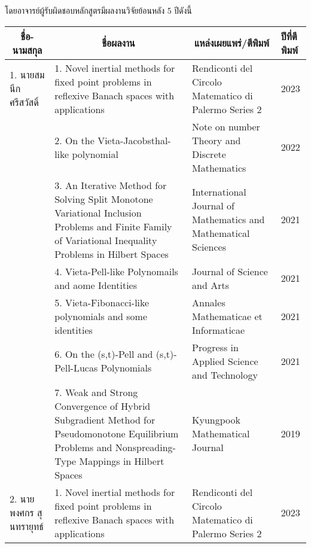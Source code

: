 \noindent โดยอาจารย์ผู้รับผิดชอบหลักสูตรมีผลงานวิจัยย้อนหลัง 5 ปีดังนี้
{\small
\begin{center}
\begin{longtable}{|p{}|p{}|p{}|p{}|}
	\hline
	\multicolumn{1}{|c|}{\textbf{ชื่อ-นามสกุล}} &
	\multicolumn{1}{c|}{\textbf{ชื่อผลงาน}} &
	\multicolumn{1}{c|}{\textbf{แหล่งเผยแพร่/ตีพิมพ์}} &
	\textbf{ปีที่ตีพิมพ์}\\
	\hline
\endhead

\hline
\endfoot	


1. นายสมนึก ศรีสวัสดิ์&
1. Novel inertial methods for fixed point problems in reflexive Banach spaces with applications &
Rendiconti del Circolo Matematico di Palermo Series 2&
2023 
\\ \cline{2-4}

&2. On the Vieta-Jacobsthal-like polynomial &
Note on number Theory and Discrete Mathematics &
2022 \\ \cline{2-4}

&3. An Iterative Method for Solving Split Monotone   Variational Inclusion Problems and Finite Family of Variational Inequality Problems in Hilbert Spaces&
International Journal of Mathematics and Mathematical Sciences&2021 
\\ \cline{2-4}

&4. Vieta-Pell-like Polynomails and aome Identities &
Journal of Science and Arts & 2021 
\\ \cline{2-4}

&5. Vieta-Fibonacci-like polynomials and some identities &
Annales Mathematicae et Informaticae &2021 
\\ \cline{2-4}

&6. On the (s,t)-Pell and (s,t)-Pell-Lucas Polynomials&
Progress in Applied Science and Technology&
2021 \\ \cline{2-4}

&7. Weak and Strong Convergence of Hybrid Subgradient Method for Pseudomonotone Equilibrium Problems and Nonspreading-Type Mappings in Hilbert Spaces&
Kyungpook Mathematical Journal &
2019 
\\ \hline

2. นายพงศกร สุนทรายุทธ์&
1. Novel inertial methods \newline for   
fixed point problems in  
reflexive Banach spaces 
with applications &
Rendiconti del Circolo Matematico di Palermo Series 2&
2023 \\ \cline{2-4}


\end{longtable}
\end{center}}
